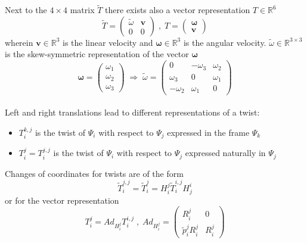 \documentclass[a4paper,twoside, openright,12pt]{report}
\newcommand{\f}[1]{\boldsymbol{#1}}
\begin{document}
Next to the $4  \times 4$ matrix $\tilde{T} $ there exists also a vector representation $T\in \mathbb{R}^6$
\begin{equation}
 \tilde{T} = \begin{pmatrix}\tilde{\omega} & \f{v} \\ 0 & 0\end{pmatrix} \; , \; T = \begin{pmatrix} \boldsymbol{\omega} \\ \f{v}\end{pmatrix} \end{equation}
wherein $\f{v} \in \mathbb{R}^3$ is the linear velocity and $\boldsymbol{\omega} \in \mathbb{R}^3$ is the angular velocity. $\tilde{\omega} \in \mathbb{R}^{3 \times 3}$ is the skew-symmetric representation of the vector $\boldsymbol{\omega}$
\begin{equation}\label{EQ:skewsymmetricop}
\boldsymbol{\omega} = \begin{pmatrix}
\omega_1 \\ \omega_2 \\ \omega_3\end{pmatrix} \; \Rightarrow \; \tilde{\omega} = \begin{pmatrix}0 & -\omega_3 & \omega_2 \\ \omega_3 & 0 & \omega_1 \\ -\omega_2 & \omega_1 & 0\end{pmatrix} \end{equation} \\

Left and right translations lead to different representations of a twist:
\begin{itemize}
\item $T_i^{k,j}$ is the twist of $\Psi_i$ with respect to $\Psi_j$ expressed in the frame $\Psi_k$
\item $T_i^j = T_i^{j,j}$ is the twist of $\Psi_i$ with respect to $\Psi_j$ expressed naturally in $\Psi_j$ 
\end{itemize}

Changes of coordinates for twists are of the form 
\begin{equation}
\tilde{T}_i^{j,j} = \tilde{T}_i^{j} = H_i^j \tilde{T}_i^{i,j} H_j^i\end{equation}
or for the vector representation
\begin{equation}
 T_i^{j} = Ad_{H_i^j} T_i^{i,j} \; , \;
Ad_{H_i^j} = \begin{pmatrix}R_i^j & 0 \\ \tilde{p}_i^j R_i^j & R_i^j\end{pmatrix} \end{equation}
\end{document}
